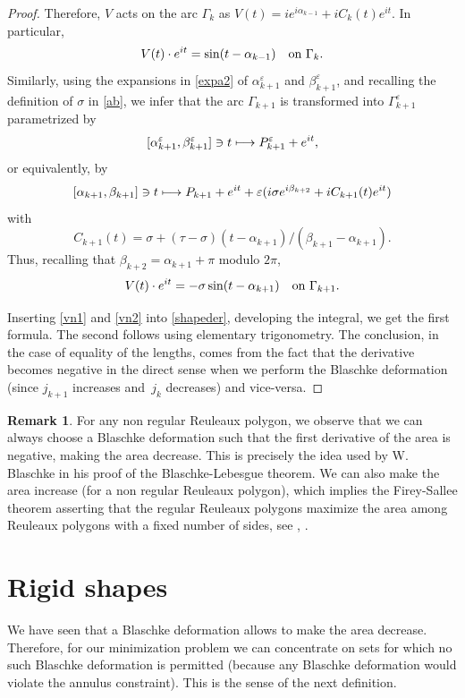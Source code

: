 \documentclass[11pt]{article}
\numberwithin{equation}{section}
\newcommand\mto{\mathchoice{\longmapsto}{\mapsto}{\mapsto}{\mapsto}}
\let\epsilon\varepsilon
\theoremstyle{plain}
\theoremstyle{definition}
\newtheorem{remark}[theorem]{Remark}
\let \e\epsilon
\let\B\Gamma
\begin{document}
\begin{proof}
Therefore, $V$ acts on the arc $\B_k$ as $V(t)= i e^{i\alpha_{k-1}} + i C_k(t)e^{it}$. In particular,
\begin{equation}\label{vn1}
V(t)\cdot e^{it} = \sin(t-\alpha_{k-1}) \quad \hbox{on }\B_{k}.
\end{equation}
Similarly, using the expansions in \eqref{expa2} of $\alpha_{k+1}^\e$ and $\beta_{k+1}^\e$, and recalling the definition of $\sigma$ in \eqref{ab}, we infer that the arc $\B_{k+1}$ is transformed into $\B_{k+1}^\e$ {parametrized by}
\[
[\alpha_{k+1}^\e,\beta_{k+1}^\e] \ni t \mto P_{k+1}^\e + e^{it},
\]
{or equivalently, by}
\[
[\alpha_{k+1},\beta_{k+1}] \ni t \mto P_ {k+1} + e^{it} + \e (i \sigma e^{i \beta_{k+2}} + i C_{k+1}(t)e^{it})
\]
with
\[
C_{k+1}(t)= \sigma + (\tau-\sigma)(t-\alpha_{k+1})/(\beta_{k+1}-\alpha_{k+1}).
\]
Thus, recalling that $\beta_{k+2}=\alpha_{k+1}+\pi$ modulo $2\pi$,
\begin{equation}\label{vn2}
V(t)\cdot e^{it} =-\sigma \sin (t-\alpha_{k+1})\quad \hbox{on }\B_{k+1}.
\end{equation}

Inserting \eqref{vn1} and \eqref{vn2} into \eqref{shapeder}, developing the integral, we get the first formula. The second follows using elementary trigonometry. The conclusion, in
the case of equality of the lengths, comes from the fact that the derivative becomes negative
in the direct sense when we perform the Blaschke deformation (since $j_{k+1}$ increases
and~$j_k$ decreases) and vice-versa.
\end{proof}

\begin{remark} For any non regular Reuleaux polygon, we observe that
we can always choose a Blaschke deformation such that the first derivative of the area
is negative, making the area decrease. This is precisely
the idea used by W. Blaschke in his proof of the Blaschke-Lebesgue theorem. We can also
make the area increase (for a non regular Reuleaux polygon), which implies the Firey-Sallee
theorem asserting that the regular Reuleaux polygons maximize the area among Reuleaux polygons
with a fixed number of sides, see \cite{CG}, \cite{KM}.
\end{remark}

\section{Rigid shapes}\label{sec-rs}
We have seen that a Blaschke deformation allows to make the area decrease. Therefore,
for our minimization problem we can concentrate on sets for which no such Blaschke
deformation is
permitted (because any Blaschke deformation would violate the annulus constraint). This is the sense of the next definition.
\end{document}
